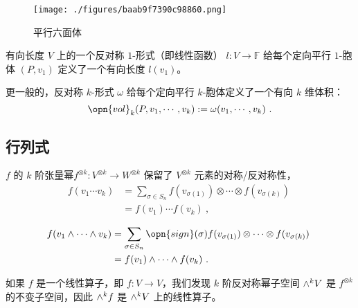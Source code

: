 \begin{figure}[ht]
\centering
\texttt{[image: ./figures/baab9f7390c98860.png]}
\caption{平行六面体} \label{fig_APdet_2}
\end{figure}

\begin{example}{有向长度}
$V$ 上的一个反对称 $1$-形式（即线性函数） $l: V \to \mathbb{F}$ 给每个定向平行 $1$-胞体 $(P, v_1)$ 定义了一个有向长度 $l(v_1)$。
\end{example}
更一般的，反对称 $k$-形式 $\omega$ 给每个定向平行 $k$-胞体定义了一个有向 $k$ 维体积：
\begin{equation}
\opn{vol}_k(P, v_1, \cdots, v_k): = \omega(v_1, \cdots, v_k)~.
\end{equation}







\subsection{行列式}

$f$ 的 $k$ 阶张量幂$f^{\otimes k}: V^{\otimes k} \to W^{\otimes k}$ 保留了 $V^{\otimes k}$ 元素的对称/反对称性，
\begin{equation}
\begin{aligned}
f(v_1 \cdots v_k) &= \sum_{\sigma \in S_n} f(v_{\sigma(1)}) \otimes \cdots \otimes f(v_{\sigma(k)}) \\
&= f(v_1) \cdots f(v_k)~,
\end{aligned}~
\end{equation}

\begin{equation}
\begin{aligned}
f(v_1 \wedge \cdots \wedge v_k) &= \sum_{\sigma \in S_n} \opn{sign}(\sigma) f(v_{\sigma(1)}) \otimes \cdots \otimes f(v_{\sigma(k)}) \\
&= f(v_1) \wedge \cdots \wedge f(v_k)~.
\end{aligned}~
\end{equation}


如果 $f$ 是一个线性算子，即 $f: V \to V$，我们发现 $k$ 阶反对称幂子空间 ${\large \wedge}^k V$ 是 $f^{\otimes k}$ 的不变子空间，因此 ${\large \wedge}^k f$ 是 ${\large \wedge}^k V$ 上的线性算子。



